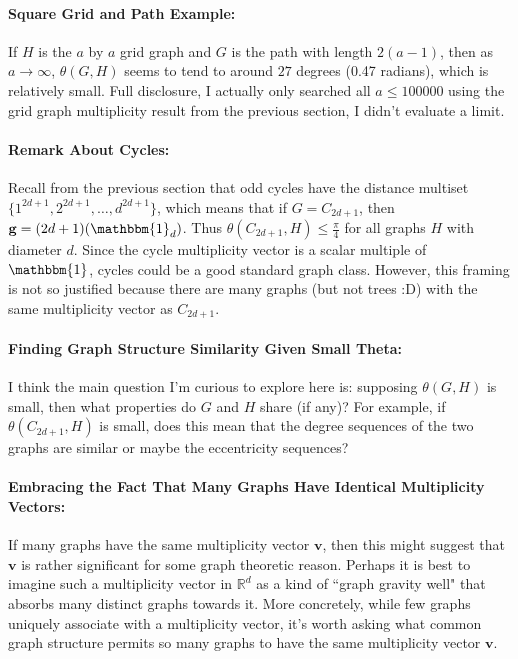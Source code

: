 \documentclass[12]{article}
\newcommand{\R}{\mathbb{R}}
\theoremstyle{definition}
\begin{document}
	\paragraph{Square Grid and Path Example:} If $H$ is the $a$ by $a$ grid graph and $G$ is the path with length $2(a-1)$, then as $a \rightarrow \infty$, $\theta(G,H)$ seems to tend to around $27$ degrees (0.47 radians), which is relatively small.  Full disclosure, I actually only searched all $a \leq 100000$ using the grid graph multiplicity result from the previous section, I didn't evaluate a limit. 
	
	\paragraph{Remark About Cycles:} Recall from the previous section that odd cycles have the distance multiset $\{1^{2d+1}, 2^{2d+1}, \ldots, d^{2d+1}\}$, which means that if $G = C_{2d+1}$, then $\mathbf{g} = (2d+1)(\mathbbm{1}_d)$.  Thus $\theta(C_{2d+1},H) \leq \tfrac{\pi}{4}$ for all graphs $H$ with diameter $d$.  Since the cycle multiplicity vector is a scalar multiple of $\mathbbm{1}$, cycles could be a good standard graph class.  However, this framing is not so justified because there are many graphs (but not trees :D) with the same multiplicity vector as $C_{2d+1}$.
	
	\paragraph{Finding Graph Structure Similarity Given Small Theta:} I think the main question I'm curious to explore here is: supposing $\theta(G,H)$ is small, then what properties do $G$ and $H$ share (if any)?  For example, if $\theta(C_{2d+1},H)$ is small, does this mean that the degree sequences of the two graphs are similar or maybe the eccentricity sequences?
	
	\paragraph{Embracing the Fact That Many Graphs Have Identical Multiplicity Vectors:} If many graphs have the same multiplicity vector $\mathbf{v}$, then this might suggest that $\mathbf{v}$ is rather significant for some graph theoretic reason.  Perhaps it is best to imagine such a multiplicity vector in $\R^d$ as a kind of ``graph gravity well" that absorbs many distinct graphs towards it.  More concretely, while few graphs uniquely associate with a multiplicity vector, it's worth asking what common graph structure permits so many graphs to have the same multiplicity vector $\mathbf{v}$.
	
\end{document}
